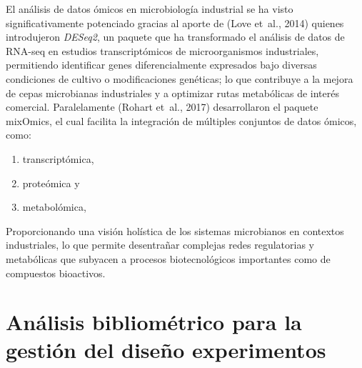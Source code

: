 \documentclass[
  spanish,
  letterpaper,
  DIV=11,
  numbers=noendperiod]{scrreprt}
\providecommand{\tightlist}{%
  \setlength{\itemsep}{0pt}\setlength{\parskip}{0pt}}
\begin{document}
\begin{tcolorbox}[enhanced jigsaw, colback=white, breakable, toptitle=1mm, toprule=.15mm, colbacktitle=quarto-callout-caution-color!10!white, bottomrule=.15mm, coltitle=black, titlerule=0mm, opacityback=0, leftrule=.75mm, bottomtitle=1mm, colframe=quarto-callout-caution-color-frame, left=2mm, title=\textcolor{quarto-callout-caution-color}{\faFire}\hspace{0.5em}{Expandir para aprender son el analis de datos ómicos}, rightrule=.15mm, opacitybacktitle=0.6, arc=.35mm]

El análisis de datos ómicos en microbiología industrial se ha visto
significativamente potenciado gracias al aporte de (Love et~al., 2014)
quienes introdujeron \emph{DESeq2}, un paquete que ha transformado el
análisis de datos de RNA-seq en estudios transcriptómicos de
microorganismos industriales, permitiendo identificar genes
diferencialmente expresados bajo diversas condiciones de cultivo o
modificaciones genéticas; lo que contribuye a la mejora de cepas
microbianas industriales y a optimizar rutas metabólicas de interés
comercial. Paralelamente (Rohart et~al., 2017) desarrollaron el paquete
mixOmics, el cual facilita la integración de múltiples conjuntos de
datos ómicos, como:

\begin{enumerate}
\def\labelenumi{(\roman{enumi})}
\tightlist
\item
  transcriptómica,
\item
  proteómica y
\item
  metabolómica,
\end{enumerate}

Proporcionando una visión holística de los sistemas microbianos en
contextos industriales, lo que permite desentrañar complejas redes
regulatorias y metabólicas que subyacen a procesos biotecnológicos
importantes como de compuestos bioactivos.

\end{tcolorbox}


\chapter{Análisis bibliométrico para la gestión del diseño
experimentos}\label{anuxe1lisis-bibliomuxe9trico-para-la-gestiuxf3n-del-diseuxf1o-experimentos}
\end{document}
